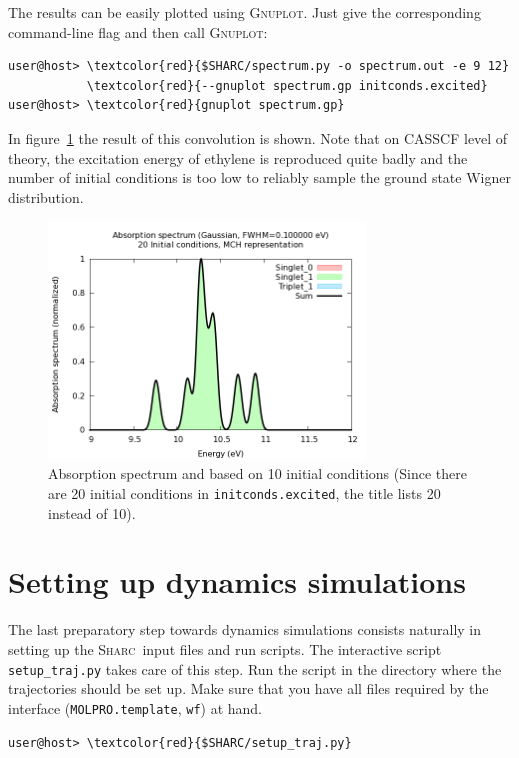 \documentclass[a4paper,11pt,DIV=15,openany]{scrbook}
\newcommand{\sharc}{\textsc{Sharc}}
\newcommand{\ttt}[1]{\texttt{#1}}
\begin{document}
\normalsize
The results can be easily plotted using \textsc{Gnuplot}. Just give the corresponding command-line flag and then call \textsc{Gnuplot}:
\begin{Verbatim}[commandchars=\\\{\}]
user@host> \textcolor{red}{$SHARC/spectrum.py -o spectrum.out -e 9 12}
           \textcolor{red}{--gnuplot spectrum.gp initconds.excited}
user@host> \textcolor{red}{gnuplot spectrum.gp}
\end{Verbatim}


In figure~\ref{fig:spectrum} the result of this convolution is shown. Note that on CASSCF level of theory, the excitation energy of ethylene is reproduced quite badly and the number of initial conditions is too low to reliably sample the ground state Wigner distribution.

\begin{figure}[h]
  \centering
  \includegraphics[width=0.75\textwidth]{figures/spectrum.png}
  \caption{Absorption spectrum and based on 10 initial conditions (Since there are 20 initial conditions in \ttt{initconds.excited}, the title lists 20 instead of 10).}
  \label{fig:spectrum}
\end{figure}











\clearpage
\section{Setting up dynamics simulations}

The last preparatory step towards dynamics simulations consists naturally in setting up the \sharc\ input files and run scripts. The interactive script \ttt{setup\_traj.py} takes care of this step. Run the script in the directory where the trajectories should be set up. Make sure that you have all files required by the interface (\ttt{MOLPRO.template}, \ttt{wf}) at hand.
\begin{Verbatim}[commandchars=\\\{\}]
user@host> \textcolor{red}{$SHARC/setup_traj.py}
\end{Verbatim}
\end{document}

